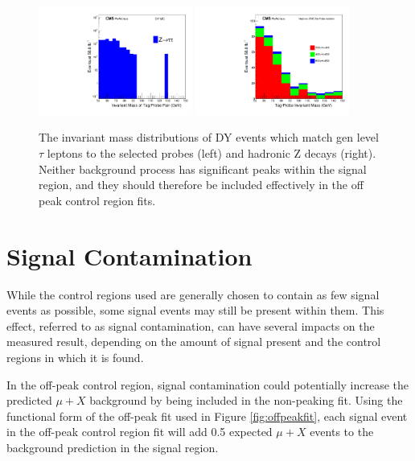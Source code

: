 \begin{figure}[htp]
    \centering
    \includegraphics[width=0.45\textwidth]{figures/tauZInvMass.pdf}
    \includegraphics[width=0.45\textwidth]{figures/hadronZInvMass.pdf}
     \caption[The invariant mass of hadronic and $\tau$ Z decays]{The invariant mass distributions of DY events which match gen level $\tau$ leptons to the selected probes (left) and hadronic Z decays (right). Neither background process has significant peaks within the signal region, and they should therefore be included effectively in the off peak control region fits.}
    \label{fig:ZtoTauTau}
\end{figure}

\section{Signal Contamination}
\label{sec:SigContamination}
While the control regions used are generally chosen to contain as few signal events as possible, some signal events may still be present within them.
This effect, referred to as signal contamination, can have several impacts on the measured result, depending on the amount of signal present and the control regions in which it is found.

In the off-peak control region, signal contamination could potentially increase the predicted $\mu+X$ background by being included in the non-peaking fit. 
Using the functional form of the off-peak fit used in Figure \ref{fig:offpeakfit}, each signal event in the off-peak control region fit will add 0.5 expected $\mu+X$ events to the background prediction in the signal region.

